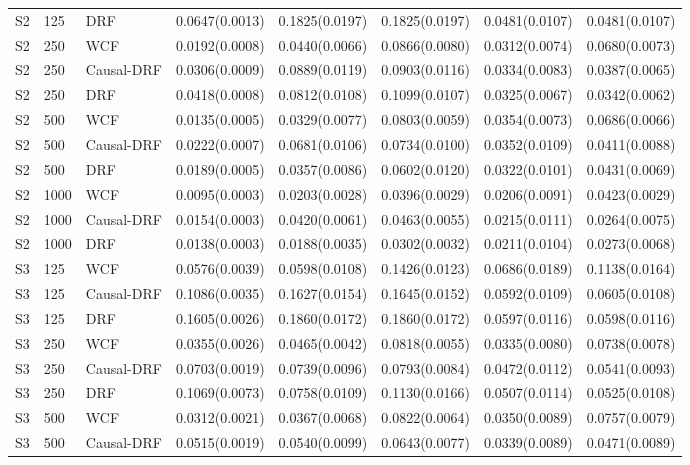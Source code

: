 \begin{longtable}{lllrrrrr}
S2 & 125 & DRF & 0.0647(0.0013) & 0.1825(0.0197) & 0.1825(0.0197) & 0.0481(0.0107) & 0.0481(0.0107) \\
\addlinespace
S2 & 250 & WCF & 0.0192(0.0008) & 0.0440(0.0066) & 0.0866(0.0080) & 0.0312(0.0074) & 0.0680(0.0073) \\
S2 & 250 & Causal-DRF & 0.0306(0.0009) & 0.0889(0.0119) & 0.0903(0.0116) & 0.0334(0.0083) & 0.0387(0.0065) \\
S2 & 250 & DRF & 0.0418(0.0008) & 0.0812(0.0108) & 0.1099(0.0107) & 0.0325(0.0067) & 0.0342(0.0062) \\
\addlinespace
S2 & 500 & WCF & 0.0135(0.0005) & 0.0329(0.0077) & 0.0803(0.0059) & 0.0354(0.0073) & 0.0686(0.0066) \\
S2 & 500 & Causal-DRF & 0.0222(0.0007) & 0.0681(0.0106) & 0.0734(0.0100) & 0.0352(0.0109) & 0.0411(0.0088) \\
S2 & 500 & DRF & 0.0189(0.0005) & 0.0357(0.0086) & 0.0602(0.0120) & 0.0322(0.0101) & 0.0431(0.0069) \\
\addlinespace
S2 & 1000 & WCF & 0.0095(0.0003) & 0.0203(0.0028) & 0.0396(0.0029) & 0.0206(0.0091) & 0.0423(0.0029) \\
S2 & 1000 & Causal-DRF & 0.0154(0.0003) & 0.0420(0.0061) & 0.0463(0.0055) & 0.0215(0.0111) & 0.0264(0.0075) \\
S2 & 1000 & DRF & 0.0138(0.0003) & 0.0188(0.0035) & 0.0302(0.0032) & 0.0211(0.0104) & 0.0273(0.0068) \\
\addlinespace
\midrule
S3 & 125 & WCF & 0.0576(0.0039) & 0.0598(0.0108) & 0.1426(0.0123) & 0.0686(0.0189) & 0.1138(0.0164) \\
S3 & 125 & Causal-DRF & 0.1086(0.0035) & 0.1627(0.0154) & 0.1645(0.0152) & 0.0592(0.0109) & 0.0605(0.0108) \\
S3 & 125 & DRF & 0.1605(0.0026) & 0.1860(0.0172) & 0.1860(0.0172) & 0.0597(0.0116) & 0.0598(0.0116) \\
\addlinespace
S3 & 250 & WCF & 0.0355(0.0026) & 0.0465(0.0042) & 0.0818(0.0055) & 0.0335(0.0080) & 0.0738(0.0078) \\
S3 & 250 & Causal-DRF & 0.0703(0.0019) & 0.0739(0.0096) & 0.0793(0.0084) & 0.0472(0.0112) & 0.0541(0.0093) \\
S3 & 250 & DRF & 0.1069(0.0073) & 0.0758(0.0109) & 0.1130(0.0166) & 0.0507(0.0114) & 0.0525(0.0108) \\
\addlinespace
S3 & 500 & WCF & 0.0312(0.0021) & 0.0367(0.0068) & 0.0822(0.0064) & 0.0350(0.0089) & 0.0757(0.0079) \\
S3 & 500 & Causal-DRF & 0.0515(0.0019) & 0.0540(0.0099) & 0.0643(0.0077) & 0.0339(0.0089) & 0.0471(0.0089) \\

\end{longtable}
